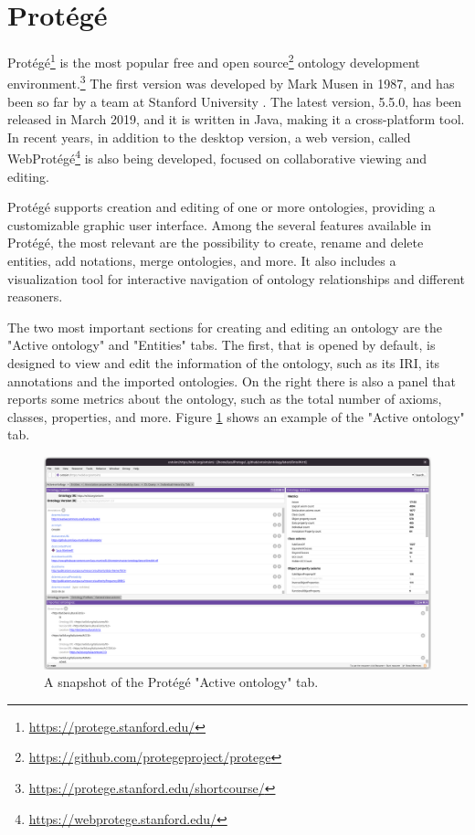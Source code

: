 \section{Protégé}
\label{sec:protege}

Protégé\footnote{\url{https://protege.stanford.edu/}} is the most popular free and open source\footnote{\url{https://github.com/protegeproject/protege}} ontology development environment.\footnote{\url{https://protege.stanford.edu/shortcourse/}} The first version was developed by Mark Musen in 1987, and has been so far by a team at Stanford University \cite{gennari2003evolution}. The latest version, 5.5.0, has been released in March 2019, and it is written in Java, making it a cross-platform tool. In recent years, in addition to the desktop version, a web version, called WebProtégé\footnote{\url{https://webprotege.stanford.edu/}} is also being developed, focused on collaborative viewing and editing.

Protégé supports creation and editing of one or more ontologies, providing a customizable graphic user interface. Among the several features available in Protégé, the most relevant are the possibility to create, rename and delete entities, add notations, merge ontologies, and more. It also includes a visualization tool for interactive navigation of ontology relationships and different reasoners.

The two most important sections for creating and editing an ontology are the "Active ontology" and "Entities" tabs. The first, that is opened by default, is designed to view and edit the information of the ontology, such as its \ac{IRI}, its annotations and the imported ontologies. On the right there is also a panel that reports some metrics about the ontology, such as the total number of axioms, classes, properties, and more. Figure \ref{fig:protege-home} shows an example of the "Active ontology" tab.

\begin{figure}[!ht]
  \centering
  \includegraphics[width=\columnwidth]{images/protege/protege-home}
  \caption{A snapshot of the Protégé "Active ontology" tab.}
  \label{fig:protege-home}
\end{figure}

